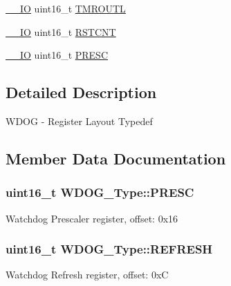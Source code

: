 \begin{DoxyCompactItemize}
\item 
\hyperlink{core__sc300_8h_aec43007d9998a0a0e01faede4133d6be}{\+\_\+\+\_\+\+IO} uint16\+\_\+t \hyperlink{structWDOG__Type_ad2297941f143a2e12377e57a3281e0f8}{T\+M\+R\+O\+U\+TL}
\item 
\hyperlink{core__sc300_8h_aec43007d9998a0a0e01faede4133d6be}{\+\_\+\+\_\+\+IO} uint16\+\_\+t \hyperlink{structWDOG__Type_a93f2183d7dd58677141d9d93cd7d09c3}{R\+S\+T\+C\+NT}
\item 
\hyperlink{core__sc300_8h_aec43007d9998a0a0e01faede4133d6be}{\+\_\+\+\_\+\+IO} uint16\+\_\+t \hyperlink{structWDOG__Type_ac89857a2cb18752c0ea2b7eeefb64c0c}{P\+R\+E\+SC}
\end{DoxyCompactItemize}


\subsection{Detailed Description}
W\+D\+OG -\/ Register Layout Typedef 

\subsection{Member Data Documentation}
\subsubsection[{\texorpdfstring{P\+R\+E\+SC}{PRESC}}]{ uint16\+\_\+t W\+D\+O\+G\+\_\+\+Type\+::\+P\+R\+E\+SC}\hypertarget{structWDOG__Type_ac89857a2cb18752c0ea2b7eeefb64c0c}{}\label{structWDOG__Type_ac89857a2cb18752c0ea2b7eeefb64c0c}
Watchdog Prescaler register, offset\+: 0x16 
\subsubsection[{\texorpdfstring{R\+E\+F\+R\+E\+SH}{REFRESH}}]{ uint16\+\_\+t W\+D\+O\+G\+\_\+\+Type\+::\+R\+E\+F\+R\+E\+SH}\hypertarget{structWDOG__Type_a9ddd941eefce6239d2e0341bc7fb7ca9}{}\label{structWDOG__Type_a9ddd941eefce6239d2e0341bc7fb7ca9}
Watchdog Refresh register, offset\+: 0xC 
